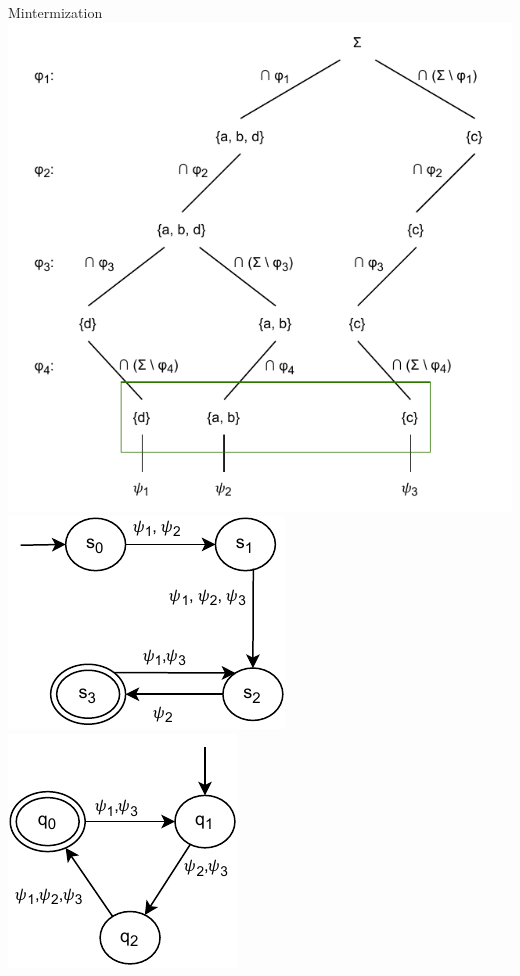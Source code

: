 \begin{frame}{Mintermization}
{    }
     {
    \centering\includegraphics[width=0.8\linewidth]{img/mintermization_example.pdf}
    }
     {
    \centering\includegraphics[scale=1]{img/mintermization_automaton_m1_with_minterms.pdf}
    \hfill
    \centering\includegraphics[scale=1]{img/mintermization_automaton_m2_with_minterms.pdf}
    }
\end{frame}




